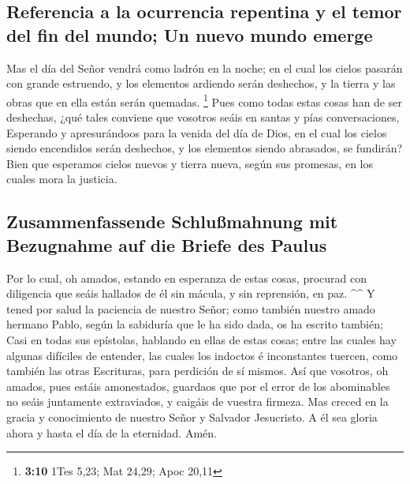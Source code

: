 \hypertarget{referencia-a-la-ocurrencia-repentina-y-el-temor-del-fin-del-mundo-un-nuevo-mundo-emerge}{%
\subsection{Referencia a la ocurrencia repentina y el temor del fin del
mundo; Un nuevo mundo
emerge}\label{referencia-a-la-ocurrencia-repentina-y-el-temor-del-fin-del-mundo-un-nuevo-mundo-emerge}}

 Mas el día del Señor vendrá como ladrón en la noche; en el
cual los cielos pasarán con grande estruendo, y los elementos ardiendo
serán deshechos, y la tierra y las obras que en ella están serán
quemadas. \footnote{\textbf{3:10} 1Tes 5,23; Mat 24,29; Apoc 20,11}
 Pues como todas estas cosas han de ser deshechas, ¿qué
tales conviene que vosotros seáis en santas y pías conversaciones,
 Esperando y apresurándoos para la venida del día de Dios,
en el cual los cielos siendo encendidos serán deshechos, y los elementos
siendo abrasados, se fundirán?  Bien que esperamos cielos
nuevos y tierra nueva, según sus promesas, en los cuales mora la
justicia.

\hypertarget{zusammenfassende-schluuxdfmahnung-mit-bezugnahme-auf-die-briefe-des-paulus}{%
\subsection{Zusammenfassende Schlußmahnung mit Bezugnahme auf die Briefe
des
Paulus}\label{zusammenfassende-schluuxdfmahnung-mit-bezugnahme-auf-die-briefe-des-paulus}}

 Por lo cual, oh amados, estando en esperanza de estas
cosas, procurad con diligencia que seáis hallados de él sin mácula, y
sin reprensión, en paz. \^{}\^{}  Y tened por salud la
paciencia de nuestro Señor; como también nuestro amado hermano Pablo,
según la sabiduría que le ha sido dada, os ha escrito también;
 Casi en todas sus epístolas, hablando en ellas de estas
cosas; entre las cuales hay algunas difíciles de entender, las cuales
los indoctos é inconstantes tuercen, como también las otras Escrituras,
para perdición de sí mismos.  Así que vosotros, oh amados,
pues estáis amonestados, guardaos que por el error de los abominables no
seáis juntamente extraviados, y caigáis de vuestra firmeza.
 Mas creced en la gracia y conocimiento de nuestro Señor y
Salvador Jesucristo. A él sea gloria ahora y hasta el día de la
eternidad. Amén.
